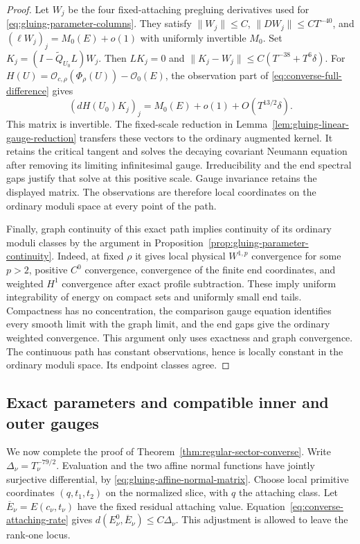\documentclass[11pt]{amsart}
\theoremstyle{definition}
\theoremstyle{remark}
\theoremstyle{plain}
\begin{document}
\begin{proof}
Let $W_j$ be the four fixed-attaching pregluing derivatives
used for \eqref{eq:gluing-parameter-columns}. They satisfy
$\|W_j\|\leq C$, $\|DW_j\|\leq CT^{-40}$, and
$(\ell W_j)_j=M_0(E)+o(1)$ with uniformly invertible $M_0$.
Set $K_j=(I-\widetilde Q_{U_0}L)W_j$.
Then $LK_j=0$ and
$\|K_j-W_j\|\leq C(T^{-38}+T^6\delta)$.
For $H(U)=\mathcal O_{c,\rho}(\Phi_\rho(U))-\mathcal O_0(E)$,
the observation part of \eqref{eq:converse-full-difference}
gives
\[
 (dH(U_0)K_j)_j=M_0(E)+o(1)+O(T^{13/2}\delta).
\]
This matrix is invertible. The fixed-scale reduction in
Lemma~\ref{lem:gluing-linear-gauge-reduction} transfers these
vectors to the ordinary augmented kernel. It retains the
critical tangent and solves the decaying covariant Neumann
equation after removing its limiting infinitesimal gauge.
Irreducibility and the end spectral gaps justify that solve
at this positive scale. Gauge invariance retains the displayed
matrix. The observations are therefore local coordinates on
the ordinary moduli space at every point of the path.

Finally, graph continuity of this exact path implies continuity
of its ordinary moduli classes by the argument in
Proposition~\ref{prop:gluing-parameter-continuity}. Indeed,
at fixed $\rho$ it gives local physical $W^{1,p}$ convergence
for some $p>2$, positive $C^0$ convergence, convergence of
the finite end coordinates, and weighted $H^1$ convergence
after exact profile subtraction. These imply uniform
integrability of energy on compact sets and uniformly small
end tails. Compactness has no concentration, the comparison
gauge equation identifies every smooth limit with the graph
limit, and the end gaps give the ordinary weighted convergence.
This argument only uses exactness and graph convergence.
The continuous path has constant observations, hence is
locally constant in the ordinary moduli space. Its endpoint
classes agree.
\end{proof}

\subsection{Exact parameters and compatible inner and outer gauges}

We now complete the proof of Theorem~\ref{thm:regular-sector-converse}.
Write $\Delta_\nu=T_\nu^{-79/2}$. Evaluation and the two
affine normal functions have jointly surjective differential,
by \eqref{eq:gluing-affine-normal-matrix}.
Choose local primitive coordinates $(q,t_1,t_2)$ on the
normalized slice, with $q$ the attaching class.
Let $\overline E_\nu=E(c_\nu,t_\nu)$ have the fixed residual
attaching value. Equation~\eqref{eq:converse-attaching-rate}
gives $d(E_\nu^0,\overline E_\nu)\leq C\Delta_\nu$.
This adjustment is allowed to leave the rank-one locus.
\end{document}
